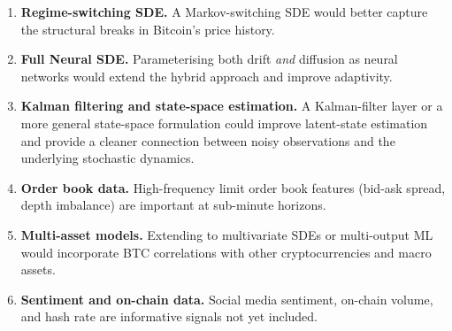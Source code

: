 \documentclass[12pt, a4paper, oneside]{report}
\theoremstyle{plain}
\theoremstyle{definition}
\theoremstyle{remark}
\begin{document}
\begin{enumerate}[leftmargin=1.25cm, label=\arabic*.]
  \item \textbf{Regime-switching SDE.}  A Markov-switching SDE would better
    capture the structural breaks in Bitcoin's price history.
  \item \textbf{Full Neural SDE.}  Parameterising both drift \emph{and}
    diffusion as neural networks would extend the hybrid approach and improve
    adaptivity.
  \item \textbf{Kalman filtering and state-space estimation.}  A Kalman-filter
    layer or a more general state-space formulation could improve latent-state
    estimation and provide a cleaner connection between noisy observations and
    the underlying stochastic dynamics.
  \item \textbf{Order book data.}  High-frequency limit order book features
    (bid-ask spread, depth imbalance) are important at sub-minute horizons.
  \item \textbf{Multi-asset models.}  Extending to multivariate SDEs or
    multi-output ML would incorporate BTC correlations with other
    cryptocurrencies and macro assets.
  \item \textbf{Sentiment and on-chain data.}  Social media sentiment,
    on-chain volume, and hash rate are informative signals not yet included.
\end{enumerate}

\clearpage
\printbibliography[heading=bibintoc, title={Bibliography}]
\end{document}
